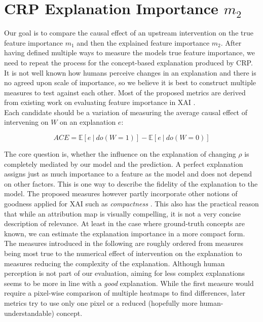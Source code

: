 \section{CRP Explanation Importance $m_2$}\label{section:measure}
Our goal is to compare the causal effect of an upstream intervention on the true feature importance $m_1$ and then the explained feature importance $m_2$. After having defined multiple ways to measure the models true feature importance, we need to repeat the process for the concept-based explanation produced by CRP. It is not well known how humans perceive changes in an explanation and there is no agreed upon scale of importance, so we believe it is best to construct multiple measures to test against each other. Most of the proposed metrics are derived from existing work on evaluating feature importance in XAI \cite{Sixt2020, Karimi2023, Arras2022}.\\

Each candidate should be a variation of measuring the average causal effect of intervening on $W$ on an explanation $e$:
\begin{center}
\begin{equation}
\displaystyle ACE = \mathbb{E} [e \ | \ do(W=1) ] - \mathbb{E} [ e \ | \ do(W=0) ]
\end{equation}
\end{center}
The core question is, whether the influence on the explanation of changing $\rho$ is completely mediated by our model and the prediction. A perfect explanation assigns just as much importance to a feature as the model and does not depend on other factors. This is one way to describe the fidelity of the explanation to the model. The proposed measures however partly incorporate other notions of goodness applied for XAI such as \textit{compactness} \cite{Nauta2023}. This also has the practical reason that while an attribution map is visually compelling, it is not a very concise description of relevance. At least in the case where ground-truth concepts are known, we can estimate the explanation importance in a more compact form. \\

The measures introduced in the following are roughly ordered from measures being most true to the numerical effect of intervention on the explanation to measures reducing the complexity of the explanation. Although human perception is not part of our evaluation, aiming for less complex explanations seems to be more in line with a \textit{good} explanation. While the first measure would require a pixel-wise comparison of multiple heatmaps to find differences, later metrics try to use only one pixel or a reduced (hopefully more human-understandable) concept. \\

